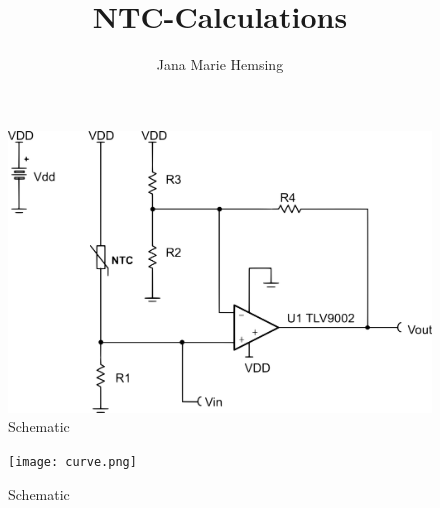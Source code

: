 \documentclass[ngerman,a4paper]{article}
\title{NTC-Calculations}
\author{Jana Marie Hemsing}
\begin{document}

\begin{figure}[!htbp]
  \centering
  \includegraphics[width=\textwidth]{schematic.png}
  \caption{Schematic}
\end{figure}



\begin{figure}[!htbp]
  \centering
  \texttt{[image: curve.png]}
  \caption{Schematic}
\end{figure}
\end{document}
